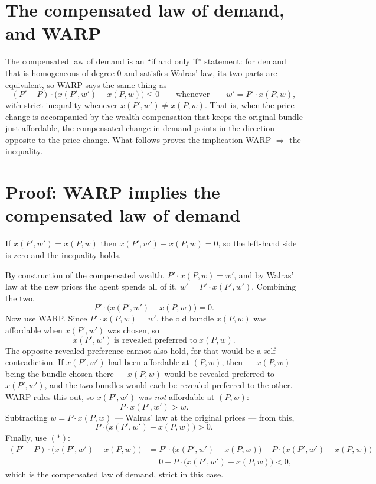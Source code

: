 \documentclass[11pt]{article}
\begin{document}

\section{The compensated law of demand, and WARP}

The compensated law of demand is an ``if and only if'' statement: for demand that is
homogeneous of degree 0 and satisfies Walras' law, its two parts are equivalent, so
WARP says the same thing as
\[ (P'-P)\cdot\bigl(x(P',w')-x(P,w)\bigr)\le 0
   \qquad\text{whenever}\qquad w'=P'\cdot x(P,w), \]
with strict inequality whenever $x(P',w')\ne x(P,w)$. That is, when the price change is accompanied by the wealth compensation that keeps
the original bundle just affordable, the compensated change in demand points in the
direction opposite to the price change. What follows proves the implication
WARP $\Rightarrow$ the inequality.

\section{Proof: WARP implies the compensated law of demand}

If $x(P',w')=x(P,w)$ then $x(P',w')-x(P,w)=0$, so the left-hand side is zero and the
inequality holds.

By construction of the compensated wealth, $P'\cdot x(P,w)=w'$, and by Walras' law at
the new prices the agent spends all of it, $w'=P'\cdot x(P',w')$. Combining the two,
\[ P'\cdot\bigl(x(P',w')-x(P,w)\bigr)=0. \tag{$*$} \]
Now use WARP. Since $P'\cdot x(P,w)=w'$, the old bundle $x(P,w)$ was affordable when
$x(P',w')$ was chosen, so
\[ x(P',w')\ \text{is revealed preferred to}\ x(P,w). \]
The opposite revealed preference cannot also hold, for that would be a
self-contradiction. If $x(P',w')$ had been affordable at $(P,w)$, then --- $x(P,w)$
being the bundle chosen there --- $x(P,w)$ would be revealed preferred to
$x(P',w')$, and the two bundles would each be revealed preferred to the other. WARP
rules this out, so $x(P',w')$ was \emph{not} affordable at $(P,w)$:
\[ P\cdot x(P',w')>w . \]
Subtracting $w=P\cdot x(P,w)$ --- Walras' law at the original prices --- from this,
\[ P\cdot\bigl(x(P',w')-x(P,w)\bigr)>0 . \]
Finally, use $(*)$:
\[
\begin{aligned}
  (P'-P)\cdot\bigl(x(P',w')-x(P,w)\bigr)
  &=P'\cdot\bigl(x(P',w')-x(P,w)\bigr)-P\cdot\bigl(x(P',w')-x(P,w)\bigr)\\
  &=0-P\cdot\bigl(x(P',w')-x(P,w)\bigr)<0 ,
\end{aligned}
\]
which is the compensated law of demand, strict in this case.
\end{document}
